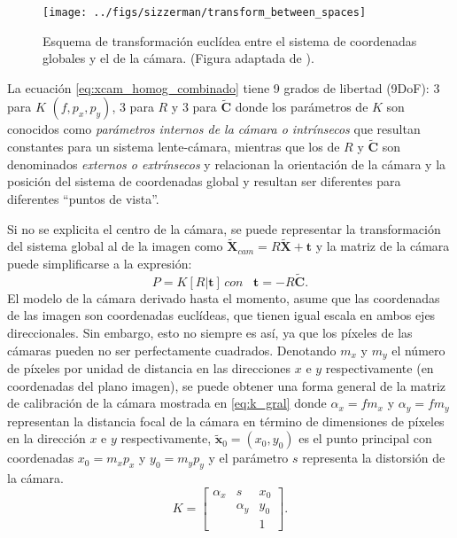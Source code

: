 \begin{figure}[tbhp]
  \centerline{\texttt{[image: ../figs/sizzerman/transform\_between\_spaces]}}
  \caption[Transformación entre diferentes espacios de coordenadas]{Esquema de transformación euclídea entre el sistema de coordenadas globales y el de la cámara. (Figura adaptada de \cite{Hartley2004}).}
  \label{fig:transform_between_spaces}
\end{figure}
La ecuación \eqref{eq:xcam_homog_combinado} tiene 9 grados de libertad (9DoF): 3 para $K$ $(f,p_x,p_y)$, 3 para $R$ y 3 para $\tilde{\mathbf{C}}$ donde los parámetros de $K$ son conocidos como \textit{parámetros internos de la cámara o intrínsecos} que resultan constantes para un sistema lente-cámara, mientras que los de $R$ y $\tilde{\mathbf{C}}$ son denominados \textit{externos o extrínsecos} y relacionan la orientación de la cámara y la posición del sistema de coordenadas global y resultan ser diferentes para diferentes ``puntos de vista''.

Si no se explicita el centro de la cámara, se puede representar la transformación del sistema global al de la imagen como $\mathbf{\tilde{X}}_{cam}=R \tilde{\mathbf{X}}+\mathbf{t}$ y la matriz de la cámara puede simplificarse a la expresión: %
\begin{equation}
 \label{eq:matrix_camera}
P=K[R|\mathbf{t}] \, con \,\,\,\,\, \mathbf{t}=-R \tilde{\mathbf{C}}.
\end{equation}
El modelo de la cámara derivado hasta el momento, asume que las coordenadas de las imagen son coordenadas euclídeas, que tienen igual escala en ambos ejes direccionales. Sin embargo, esto no siempre es así, ya que los píxeles de las cámaras pueden no ser perfectamente cuadrados. Denotando $m_x$  y $m_y$ el número de píxeles por unidad de distancia en las direcciones $x$ e $y$ respectivamente (en coordenadas del plano imagen), se puede obtener una forma general de la matriz de calibración de la cámara mostrada en \ref{eq:k_gral} donde $\alpha_x = fm_x$ y $\alpha_y = fm_y$ representan la distancia focal de la cámara en término de dimensiones de píxeles en la dirección $x$ e $y$ respectivamente, $\mathbf{\tilde{x}}_0=(x_0,y_0)$ es el punto principal con coordenadas $x_0=m_x p_x$ y $y_0 = m_y p_y$ y el parámetro $s$ representa la distorsión de la cámara.
\begin{equation}
  \label{eq:k_gral}
  K=\left[\begin{array}{ccc}
	    \alpha_x & s & x_0 \\
	    \quad & \alpha_y & y_0 \\
	    \quad & \quad & 1
	  \end{array}\right].
\end{equation}

